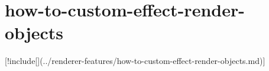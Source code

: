 \chapter{how-\/to-\/custom-\/effect-\/render-\/objects}
\hypertarget{md__hey_tea_9_2_library_2_package_cache_2com_8unity_8render-pipelines_8universal_0d14_80_88_2_do16f0a6113093c2d4c3c6529043663f7b}{}\label{md__hey_tea_9_2_library_2_package_cache_2com_8unity_8render-pipelines_8universal_0d14_80_88_2_do16f0a6113093c2d4c3c6529043663f7b}
\mbox{[}!include\mbox{[}\mbox{]}(../renderer-\/features/how-\/to-\/custom-\/effect-\/render-\/objects.md)\mbox{]} 